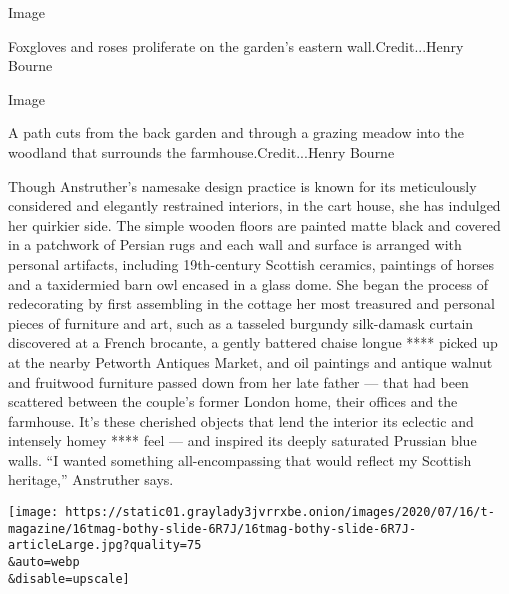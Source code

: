 Image

Foxgloves and roses proliferate on the garden's eastern
wall.Credit...Henry Bourne

Image

A path cuts from the back garden and through a grazing meadow into the
woodland that surrounds the farmhouse.Credit...Henry Bourne

Though Anstruther's namesake design practice is known for its
meticulously considered and elegantly restrained interiors, in the cart
house, she has indulged her quirkier side. The simple wooden floors are
painted matte black and covered in a patchwork of Persian rugs and each
wall and surface is arranged with personal artifacts, including
19th-century Scottish ceramics, paintings of horses and a taxidermied
barn owl encased in a glass dome. She began the process of redecorating
by first assembling in the cottage her most treasured and personal
pieces of furniture and art, such as a tasseled burgundy silk-damask
curtain discovered at a French brocante, a gently battered chaise longue
**** picked up at the nearby Petworth Antiques Market, and oil paintings
and antique walnut and fruitwood furniture passed down from her late
father --- that had been scattered between the couple's former London
home, their offices and the farmhouse. It's these cherished objects that
lend the interior its eclectic and intensely homey **** feel --- and
inspired its deeply saturated Prussian blue walls. ``I wanted something
all-encompassing that would reflect my Scottish heritage,'' Anstruther
says.

\texttt{[image: https://static01.graylady3jvrrxbe.onion/images/2020/07/16/t-magazine/16tmag-bothy-slide-6R7J/16tmag-bothy-slide-6R7J-articleLarge.jpg?quality=75\\\&auto=webp\\\&disable=upscale]}

